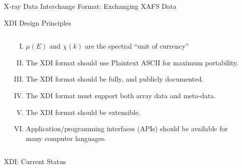 \documentclass[final]{beamer}
\begin{document}
\begin{frame}{}
\begin{columns}[t]
\begin{column}{.54\linewidth}
\begin{block}{\large  X-ray Data Interchange Format:  Exchanging
            XAFS Data}
          
        \end{block}
        
        \begin{block}{\large XDI Design Principles}

          \begin{columns}[T]
            \begin{column}{0.05\linewidth}    \end{column}
            \begin{column}{0.90\linewidth}
              
              \begin{enumerate}[I.] \normalsize
              \item $\mu(E)$ and $\chi(k)$ are the spectral ``unit of  currency''
              \item The XDI format should use Plaintext ASCII for maximum portability.
              \item The XDI format should be fully, and publicly documented.
              \item The XDI format must support both array data and meta-data.
              \item The XDI format should be extensible.
              \item Application/programming interfaces (APIs) should be
                available for many computer languages.
              \end{enumerate}

            \end{column}
            \begin{column}{0.05\linewidth}    \end{column}
          \end{columns} 
        \end{block}
        
        \begin{block}{\large XDI: Current Status}


\end{block}
\end{column}
\end{columns}
\end{frame}
\end{document}
